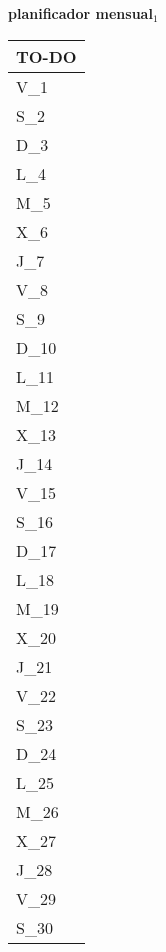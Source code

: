 \clearpage
{\raggedright
	\fontsize{25}{50}\selectfont
	\textbf{\NextYear}
}\scriptsize{\textbf{planificador mensual$_1$}}\\[11.3pt]



	\noindent\dotfill
	\renewcommand{\arraystretch}{1.5}\scriptsize
		\begin{longtabu} to \textwidth { X[l]}
		\centering \small{\textbf{TO-DO}} \\
		\toprule
		V_{1} \dotfill\\
		S_{2} \dotfill\\
		D_{3} \dotfill\\
		\hline
		L_{4} \dotfill\\
		M_{5} \dotfill\\
		X_{6} \dotfill\\
		J_{7} \dotfill\\
		V_{8} \dotfill\\
		S_{9} \dotfill\\
		D_{10} \dotfill\\
		\hline
		L_{11} \dotfill\\
		M_{12} \dotfill\\
		X_{13} \dotfill\\
		J_{14} \dotfill\\
		V_{15} \dotfill\\
		S_{16} \dotfill\\
		D_{17} \dotfill\\
		\hline
		L_{18} \dotfill\\
		M_{19} \dotfill\\
		X_{20} \dotfill\\
		J_{21} \dotfill\\
		V_{22} \dotfill\\
		S_{23} \dotfill\\
		D_{24} \dotfill\\
		\hline
		L_{25} \dotfill\\
		M_{26} \dotfill\\
		X_{27} \dotfill\\
		J_{28} \dotfill\\
		V_{29} \dotfill\\
		S_{30} \dotfill\\

		\bottomrule

	\end{longtabu}


\clearpage
